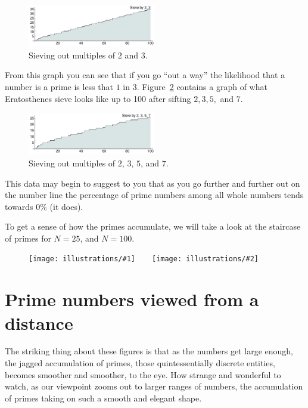 \documentclass[11pt,draft]{article}
\newcommand{\illtwo}[4]{ 
   \begin{figure}[H]
   \begin{center}
   \texttt{[image: illustrations/\#1]}$\qquad$\texttt{[image: illustrations/\#2]}
   \caption{#4}
    \end{center}
    \end{figure}
}
\theoremstyle{plain}
\theoremstyle{definition}
\numberwithin{equation}{section}
\numberwithin{figure}{section}
\numberwithin{table}{section}
\begin{document}
\begin{figure}[H]
\begin{center}
\includegraphics[width=0.5\textwidth]{illustrations/sieves3_100}
\caption{Sieving out multiples of $2$ and $3$.\label{fig:sieve3_100}}
\end{center}
\end{figure}

From this graph you can see that if you go ``out a way'' the
likelihood that a number is a prime is less that $1$ in $3
$. Figure~\ref{fig:sieve7_100} contains a graph of what Eratosthenes
sieve looks like up to 100 after sifting $2,3,5,$ and $7$.


\begin{figure}[H]
\begin{center}
\includegraphics[width=0.5\textwidth]{illustrations/sieves7_100}
\caption{Sieving out multiples of $2$, $3$, $5$, and $7$.\label{fig:sieve7_100}}
\end{center}
\end{figure}


This data may begin to suggest to you that as you go further and
further out on the number line the percentage of prime numbers among
all whole numbers tends towards $0\%$ (it does).
  

To get a sense of how the primes accumulate, we will take a look at
the staircase of primes for $N= 25$, and $N=100$.


\illtwo{PN_25}{PN_100}{.33}{}

    
    
\section{Prime numbers viewed from a distance}
The striking thing about these figures is that as the numbers get
large enough, the jagged accumulation of primes, those
quintessentially discrete entities, becomes smoother and smoother, to
the eye. How strange and wonderful to watch, as our viewpoint zooms
out to larger ranges of numbers, the accumulation of primes taking on
such a smooth and elegant shape.
\end{document}
